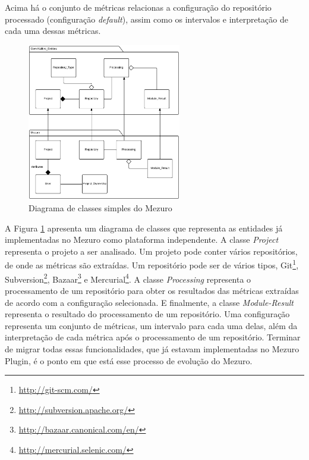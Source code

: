 Acima há o conjunto de métricas relacionas a configuração do repositório processado (configuração \textit{default}), assim como os intervalos e interpretação de cada uma dessas métricas.

\graphicspath{{figuras/}}
\begin{figure}[H]
\centering
\includegraphics[width=0.6\textwidth]{class-diagram-mezuro}
\caption{Diagrama de classes simples do Mezuro}
\label{class-diagram}
\end{figure}

A Figura \ref{class-diagram} apresenta um diagrama de classes que representa as entidades já implementadas no Mezuro como plataforma independente. A classe \textit{Project} representa o projeto a ser analisado. Um projeto pode conter vários repositórios, de onde as métricas são extraídas.  Um repositório pode ser de vários tipos, Git\footnote{\url{http://git-scm.com/}}, Subversion\footnote{\url{http://subversion.apache.org/}}, Bazaar\footnote{\url{http://bazaar.canonical.com/en/}} e Mercurial\footnote{\url{http://mercurial.selenic.com/}}. A classe \textit{Processing} representa o processamento de um repositório para obter os resultados das métricas extraídas de acordo com a configuração selecionada. E finalmente, a classe \textit{Module-Result} representa o resultado do processamento de um repositório. Uma configuração representa um conjunto de métricas, um intervalo para cada uma delas, além da interpretação de cada métrica após o processamento de um repositório. Terminar de  migrar todas essas funcionalidades, que já estavam implementadas no Mezuro Plugin, é o ponto em que está esse processo de evolução do Mezuro.



